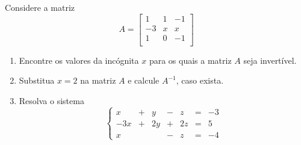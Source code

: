 \begin{problem}
Considere a matriz
$$ A=\left[ \begin{array}{rrr}
  1 & 1 & -1 \\
 -3 & x &  x \\
  1 & 0 & -1 \\
\end{array}\right]$$
\begin{enumerate}
\item[(a)] Encontre os valores da incógnita $x$ para os quais a matriz $A$ seja invertível.
\item[(b)] Substitua $x = 2$ na matriz $A$ e calcule $A^{-1}$, caso exista.
\item[(c)] Resolva o sistema 
$$\left\{\begin{array}{rrrrrrr}
  x & + &   y  & - &    z  & = &  -3 \\
-3x & + &  2y  & + &   2z  & = &   5 \\
  x &   &      & - &    z  & = &  -4
\end{array} \right.$$
\end{enumerate}
\end{problem}

